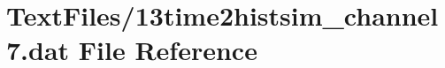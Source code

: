 \hypertarget{13time2histsim__channel7_8dat}{}\section{Text\+Files/13time2histsim\+\_\+channel7.dat File Reference}
\label{13time2histsim__channel7_8dat}
